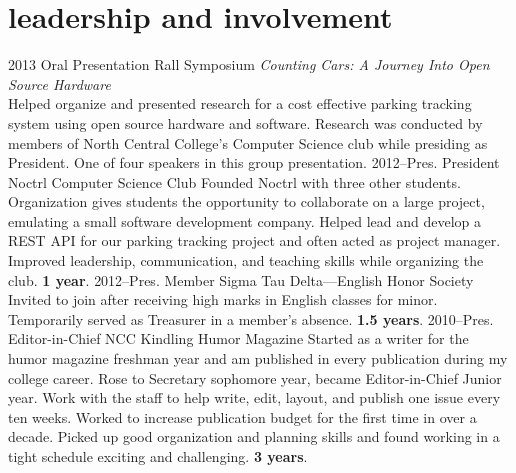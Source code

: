 \documentclass[]{friggeri-cv} %
\begin{document}

\section{leadership and involvement}

\begin{entrylist}
\entry
{2013}
{Oral Presentation}
{Rall Symposium}
{\emph{Counting Cars: A Journey Into Open Source Hardware}\\
Helped organize and presented research for a cost effective parking tracking system using open source hardware and software.
Research was conducted by members of North Central College's Computer Science club while presiding as President.
One of four speakers in this group presentation.}
\entry
{2012--Pres.}
{President}
{Noctrl Computer Science Club}
{Founded Noctrl with three other students.
Organization gives students the opportunity to collaborate on a large project, emulating a small software development company.
Helped lead and develop a REST API for our parking tracking project and often acted as project manager.
Improved leadership, communication, and teaching skills while organizing the club. \textbf{1 year}.}
\entry
{2012--Pres.}
{Member}
{Sigma Tau Delta---English Honor Society}
{Invited to join after receiving high marks in English classes for minor.
Temporarily served as Treasurer in a member's absence. \textbf{1.5 years}.}
\entry
{2010--Pres.}
{Editor-in-Chief}
{NCC Kindling Humor Magazine}
{Started as a writer for the humor magazine freshman year and am published in every publication during my college career.
Rose to Secretary sophomore year, became Editor-in-Chief Junior year.
Work with the staff to help write, edit, layout, and publish one issue every ten weeks.
Worked to increase publication budget for the first time in over a decade.
Picked up good organization and planning skills and found working in a tight schedule exciting and challenging. \textbf{3 years}.}
\end{entrylist}
\end{document}
